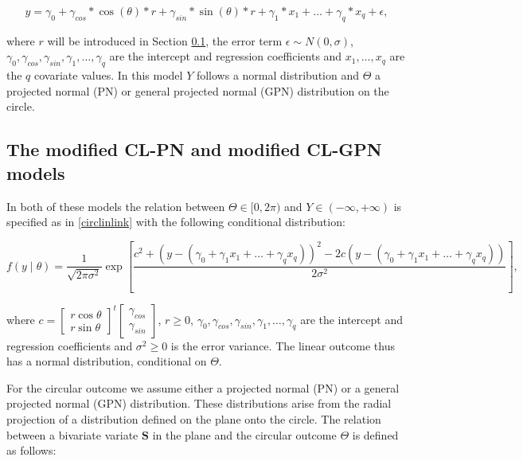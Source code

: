\documentclass[11pt,]{article}
\begin{document}
\begin{equation}\label{circlinlink}
y = \gamma_0 + \gamma_{cos}*\cos(\theta)*r + \gamma_{sin}*\sin(\theta)*r + \gamma_1*x_1 + \dots + \gamma_q*x_q +  \epsilon,
\end{equation}

where \(r\) will be introduced in Section \ref{CL-(G)PN}, the error term
\(\epsilon \sim N(0, \sigma)\),
\(\gamma_0, \gamma_{cos}, \gamma_{sin}, \gamma_1, \dots, \gamma_q\) are
the intercept and regression coefficients and \(x_1, \dots, x_q\) are
the \(q\) covariate values. In this model \(Y\) follows a normal
distribution and \(\Theta\) a projected normal (PN) or general projected
normal (GPN) distribution on the circle.

\subsection{The modified CL-PN and modified CL-GPN  models}\label{CL-(G)PN}

In both of these models the relation between \(\Theta \in [0, 2\pi)\)
and \(Y\in (-\infty, + \infty)\) is specified as in \eqref{circlinlink}
with the following conditional distribution:

\begin{equation}\label{ycondtheta}
f(y \mid \theta) = \frac{1}{\sqrt{2\pi\sigma^2}}\exp\left[\frac{c^2 + (y - (\gamma_0 + \gamma_1x_1 + \dots + \gamma_qx_q))^{2} - 2c(y - (\gamma_0 + \gamma_1x_1 + \dots + \gamma_qx_q))}{2\sigma^2}\right],
\end{equation}

where
\(c = \begin{bmatrix} r \cos \theta \\ r\sin \theta \end{bmatrix}^t \begin{bmatrix} \gamma_{cos} \\ \gamma_{sin} \end{bmatrix}\),
\(r \geq 0\),
\(\gamma_0, \gamma_{cos}, \gamma_{sin}, \gamma_1, \dots, \gamma_q\) are
the intercept and regression coefficients and \(\sigma^2 \geq 0\) is the
error variance. The linear outcome thus has a normal distribution,
conditional on \(\Theta\).

For the circular outcome we assume either a projected normal (PN) or a
general projected normal (GPN) distribution. These distributions arise
from the radial projection of a distribution defined on the plane onto
the circle. The relation between a bivariate variate \(\boldsymbol{S}\)
in the plane and the circular outcome \(\Theta\) is defined as follows:
\end{document}
